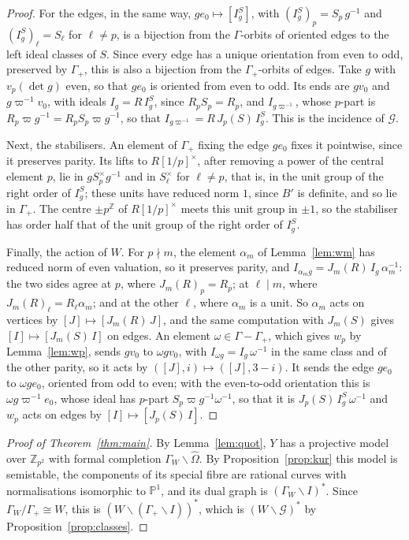 \documentclass[11pt]{amsart}
\theoremstyle{plain}
\theoremstyle{remark}
\newcommand{\Z}{\mathbb{Z}}
\newcommand{\Ohat}{\widehat{\Omega}}
\begin{document}
\begin{proof}
For the edges, in the same way, $g e_0 \mapsto [I^S_g]$, with $(I^S_g)_p = S_p\,g^{-1}$ and $(I^S_g)_\ell = S_\ell$ for $\ell \neq p$, is a bijection from the $\Gamma$-orbits of oriented edges to the left ideal classes of $S$. Since every edge has a unique orientation from even to odd, preserved by $\Gamma_+$, this is also a bijection from the $\Gamma_+$-orbits of edges. Take $g$ with $v_p(\det g)$ even, so that $g e_0$ is oriented from even to odd. Its ends are $g v_0$ and $g\varpi^{-1}v_0$, with ideals $I_g = R\,I^S_g$, since $R_pS_p = R_p$, and $I_{g\varpi^{-1}}$, whose $p$-part is $R_p\varpi g^{-1} = R_pS_p\varpi g^{-1}$, so that $I_{g\varpi^{-1}} = R\,J_p(S)\,I^S_g$. This is the incidence of $\mathcal{G}$.

Next, the stabilisers. An element of $\Gamma_+$ fixing the edge $g e_0$ fixes it pointwise, since it preserves parity. Its lifts to $R[1/p]^\times$, after removing a power of the central element $p$, lie in $g S_p^\times g^{-1}$ and in $S_\ell^\times$ for $\ell \neq p$, that is, in the unit group of the right order of $I^S_g$; these units have reduced norm $1$, since $B'$ is definite, and so lie in $\Gamma_+$. The centre $\pm p^{\Z}$ of $R[1/p]^\times$ meets this unit group in $\pm1$, so the stabiliser has order half that of the unit group of the right order of $I^S_g$.

Finally, the action of $W$. For $p \nmid m$, the element $\alpha_m$ of Lemma~\ref{lem:wm} has reduced norm of even valuation, so it preserves parity, and $I_{\alpha_m g} = J_m(R)\,I_g\,\alpha_m^{-1}$: the two sides agree at $p$, where $J_m(R)_p = R_p$; at $\ell \mid m$, where $J_m(R)_\ell = R_\ell\alpha_m$; and at the other $\ell$, where $\alpha_m$ is a unit. So $\alpha_m$ acts on vertices by $[J] \mapsto [J_m(R)\,J]$, and the same computation with $J_m(S)$ gives $[I] \mapsto [J_m(S)\,I]$ on edges. An element $\omega \in \Gamma - \Gamma_+$, which gives $w_p$ by Lemma~\ref{lem:wp}, sends $g v_0$ to $\omega g v_0$, with $I_{\omega g} = I_g\,\omega^{-1}$ in the same class and of the other parity, so it acts by $([J], i) \mapsto ([J], 3 - i)$. It sends the edge $g e_0$ to $\omega g e_0$, oriented from odd to even; with the even-to-odd orientation this is $\omega g\varpi^{-1}e_0$, whose ideal has $p$-part $S_p\varpi g^{-1}\omega^{-1}$, so that it is $J_p(S)\,I^S_g\,\omega^{-1}$ and $w_p$ acts on edges by $[I] \mapsto [J_p(S)\,I]$.
\end{proof}

\begin{proof}[Proof of Theorem~\ref{thm:main}]
By Lemma~\ref{lem:quot}, $Y$ has a projective model over $\Z_{p^2}$ with formal completion $\Gamma_W\backslash\Ohat$. By Proposition~\ref{prop:kur} this model is semistable, the components of its special fibre are rational curves with normalisations isomorphic to $\mathbb{P}^1$, and its dual graph is $(\Gamma_W\backslash I)^*$. Since $\Gamma_W/\Gamma_+ \cong W$, this is $(W\backslash(\Gamma_+\backslash I))^*$, which is $(W\backslash\mathcal{G})^*$ by Proposition~\ref{prop:classes}.
\end{proof}
\end{document}
